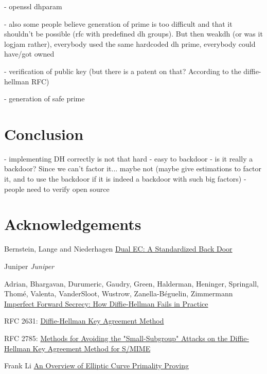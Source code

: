 \documentclass[a4paper,11pt]{article}
\begin{document}
- openssl dhparam

- also some people believe generation of prime is too difficult and that it shouldn't be possible (rfc with predefined dh groups). But then weakdh (or was it logjam rather), everybody used the same hardcoded dh prime, everybody could have/got owned

- verification of public key (but there is a patent on that? According to the diffie-hellman RFC)

- generation of safe prime

\section{Conclusion}

- implementing DH correctly is not that hard
- easy to backdoor
- is it really a backdoor? Since we can't factor it... maybe not (maybe give estimations to factor it, and to use the backdoor if it is indeed a backdoor with such big factors)
- people need to verify open source

\newpage

\section*{Acknowledgements}


\newpage

\begin{thebibliography}{1}

 Bernstein, Lange and Niederhagen \href{https://eprint.iacr.org/2015/767.pdf}{Dual EC: A Standardized Back Door}

 Juniper {\em Juniper}

 Adrian, Bhargavan, Durumeric, Gaudry, Green, Halderman, Heninger, Springall, Thomé, Valenta,  VanderSloot, Wustrow, Zanella-Béguelin, Zimmermann \href{https://weakdh.org/imperfect-forward-secrecy-ccs15.pdf}{Imperfect Forward Secrecy: How Diffie-Hellman Fails in Practice}

 RFC 2631: \href{https://tools.ietf.org/html/rfc2631}{Diffie-Hellman Key Agreement Method}

 RFC 2785: \href{https://tools.ietf.org/html/rfc2785}{Methods for Avoiding the "Small-Subgroup" Attacks on the Diffie-Hellman Key Agreement Method for S/MIME}

 Frank Li \href{http://theory.stanford.edu/~dfreeman/cs259c-f11/finalpapers/primalityproving.pdf}{An Overview of Elliptic Curve Primality Proving}

\end{thebibliography}
\end{document}
